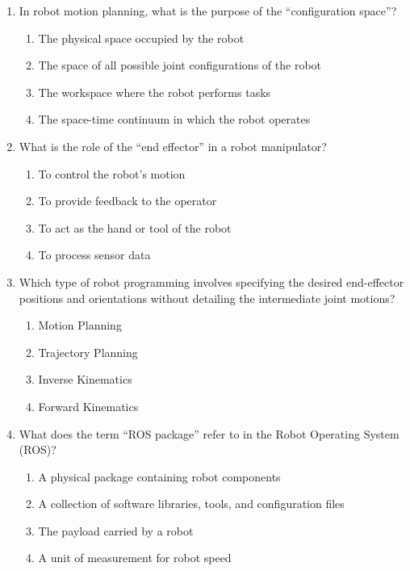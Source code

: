 \documentclass[11pt,a4paper]{article}
\begin{document}
\begin{enumerate}[label=(\roman*),leftmargin=*,itemsep=8pt]

  \item In robot motion planning, what is the purpose of the ``configuration space''?
  
\begin{enumerate}[label=(\alph*),itemsep=2pt]
    \item The physical space occupied by the robot
    \item The space of all possible joint configurations of the robot
    \item The workspace where the robot performs tasks
    \item The space-time continuum in which the robot operates
  \end{enumerate}

  \item What is the role of the ``end effector'' in a robot manipulator?
  
\begin{enumerate}[label=(\alph*),itemsep=2pt]
    \item To control the robot's motion
    \item To provide feedback to the operator
    \item To act as the hand or tool of the robot
    \item To process sensor data
  \end{enumerate}

  \item Which type of robot programming involves specifying the desired end-effector positions and orientations without detailing the intermediate joint motions?
  
\begin{enumerate}[label=(\alph*),itemsep=2pt]
    \item Motion Planning
    \item Trajectory Planning
    \item Inverse Kinematics
    \item Forward Kinematics
  \end{enumerate}

  \item What does the term ``ROS package'' refer to in the Robot Operating System (ROS)?
  
\begin{enumerate}[label=(\alph*),itemsep=2pt]
    \item A physical package containing robot components
    \item A collection of software libraries, tools, and configuration files
    \item The payload carried by a robot
    \item A unit of measurement for robot speed
  \end{enumerate}


\end{enumerate}
\end{document}
